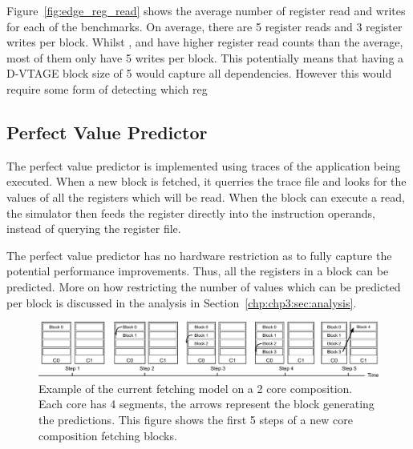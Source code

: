 Figure~\ref{fig:edge_reg_read} shows the average number of register read and writes for each of the benchmarks.
On average, there are 5 register reads and 3 register writes per block.
Whilst  ,  and  have higher register read counts than the average, most of them only have 5 writes per block.
This potentially means that having a D-VTAGE block size of 5 would capture all dependencies.
However this would require some form of detecting which reg



\subsection{Perfect Value Predictor}

The perfect value predictor is implemented using traces of the application being executed.
When a new block is fetched, it querries the trace file and looks for the values of all the registers which will be read.
When the block can execute a read, the simulator then feeds the register directly into the instruction operands, instead of querying the register file.

The perfect value predictor has no hardware restriction as to fully capture the potential performance improvements.
Thus, all the registers in a block can be predicted.
More on how restricting the number of values which can be predicted per block is discussed in the analysis in Section~\ref{chp:chp3:sec:analysis}.

\begin{figure}[t]
    \centering
    \includegraphics[width=1\textwidth]{chapter3/graphics/normfetch.pdf}
    \caption{Example of the current fetching model on a 2 core composition. Each core has 4 segments, the arrows represent the block generating the predictions. This figure shows the first 5 steps of a new core composition fetching blocks.}
    \label{fig:old_fetch}
\vspace{1em}
\end{figure}
